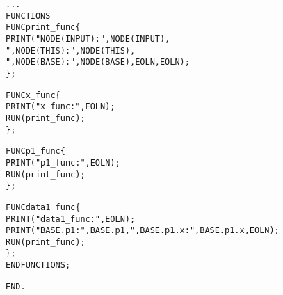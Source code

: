 \begin{boxedminipage}[t]{\linewidth}
\begin{alltt}
...
FUNCTIONS
  FUNC print_func \{
    PRINT("NODE(INPUT): ", NODE(INPUT),
          ", NODE(THIS): ", NODE(THIS),
          ", NODE(BASE): ", NODE(BASE), EOLN, EOLN);
  \};

  FUNC x_func \{
    PRINT("x_func:", EOLN);
    RUN(print_func);
  \};

  FUNC p1_func \{
    PRINT("p1_func:", EOLN);
    RUN(print_func);
  \};

  FUNC data1_func \{
    PRINT("data1_func:", EOLN);
    PRINT("BASE.p1:", BASE.p1, ", BASE.p1.x:", BASE.p1.x, EOLN);
    RUN(print_func);
  \};
END FUNCTIONS;

END.
\end{alltt}
\end{boxedminipage}
